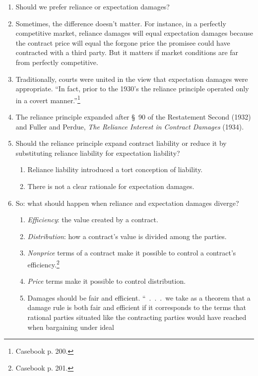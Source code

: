 \begin{enumerate}
    \item Should we prefer reliance or expectation damages?
    \item Sometimes, the difference doesn't matter. For instance, in a 
    perfectly competitive market, reliance damages will equal expectation 
    damages because the contract price will equal the forgone price the 
    promisee could have contracted with a third party. But it matters if 
    market conditions are far from perfectly competitive.
    \item Traditionally, courts were united in the view that expectation 
    damages were appropriate. ``In fact, prior to the 1930's the reliance 
    principle operated only in a covert manner.''\footnote{Casebook p. 200.}
    \item The reliance principle expanded after \S\ 90 of the Restatement 
    Second (1932) and Fuller and Perdue, \emph{The Reliance Interest in 
    Contract Damages} (1934).
    \item Should the reliance principle expand contract liability or reduce it 
    by substituting reliance liability for expectation liability?
    \begin{enumerate}
        \item Reliance liability introduced a tort conception of liability.
        \item There is not a clear rationale for expectation damages.
    \end{enumerate}
    \item So: what should happen when reliance and expectation damages 
    diverge?
    \begin{enumerate}
        \item \emph{Efficiency}: the value created by a contract.
        \item \emph{Distribution}: how a contract's value is divided among the 
        parties.
        \item \emph{Nonprice} terms of a contract make it possible to control 
        a contract's efficiency.\footnote{Casebook p. 201.}
        \item \emph{Price} terms make it possible to control distribution.
        \item Damages should be fair and efficient. ``~.~.~.~we take as a 
        theorem that a damage rule is both fair and efficient if it 
        corresponds to the terms that rational parties situated like the 
        contracting parties would have reached when bargaining under ideal 

\end{enumerate}
\end{enumerate}
